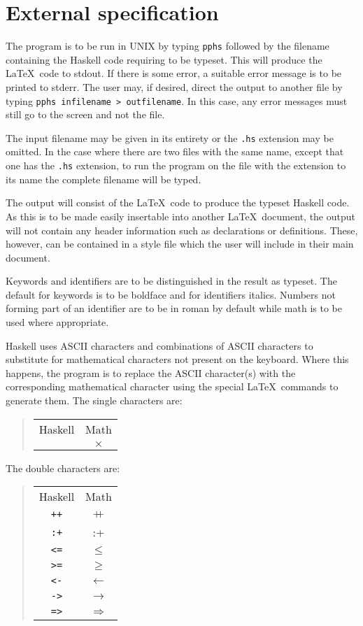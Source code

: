 \section{External specification}

The program is to be run in UNIX by typing {\tt pphs} followed by the
filename containing the Haskell code requiring to be typeset.  This will
produce the \LaTeX\ code to stdout.  If there is some error,
a suitable error message is to be printed to stderr.  The user may, if
desired, direct the output to another file by typing {\tt pphs infilename > outfilename}.
In this case, any error messages must still go to the screen and not the file.

The input filename may be given in its entirety or the {\tt .hs} extension may be omitted.
In the case where there are two files with the same name, except that one has the
{\tt .hs} extension, to run the program on the file with the extension to its name
the complete filename will be typed.

The output will consist of the \LaTeX\ code to produce the typeset Haskell
code.  As this is to be made easily insertable into another \LaTeX\ document, the output
will not contain any header information such as declarations or definitions.  These,
however, can
be contained in a style file which the user will include in their main document.

Keywords and identifiers are to be distinguished in the result as typeset.
The default for keywords is to be boldface and for identifiers italics.
Numbers not forming part of an identifier are to be in roman by default
while math is to be used where appropriate.

Haskell uses ASCII characters and combinations of ASCII characters 
to substitute for mathematical characters not present on the
keyboard.  Where this happens, the program is to replace the ASCII character(s)
with the corresponding mathematical character using the special \LaTeX\ commands
to generate them.  The single characters are:
\begin{quote}
\begin{tabular}[t]{@{}cc@{}}
Haskell & Math\\
{\tt *} & $\times$
\end{tabular}
\end{quote}
The double characters are:
\begin{quote}
\begin{tabular}[t]{@{}cc@{}}
Haskell & Math\\
{\tt ++} & {\hbox{$+\mkern-7.5mu+$}}\\
{\tt :+} & {:}{+}\\
{\tt <=} & $\leq$\\
{\tt >=} & $\geq$\\
{\tt <-} & $\leftarrow$\\
{\tt ->} & $\rightarrow$\\
{\tt =>} & $\Rightarrow$
\end{tabular}
\end{quote}

